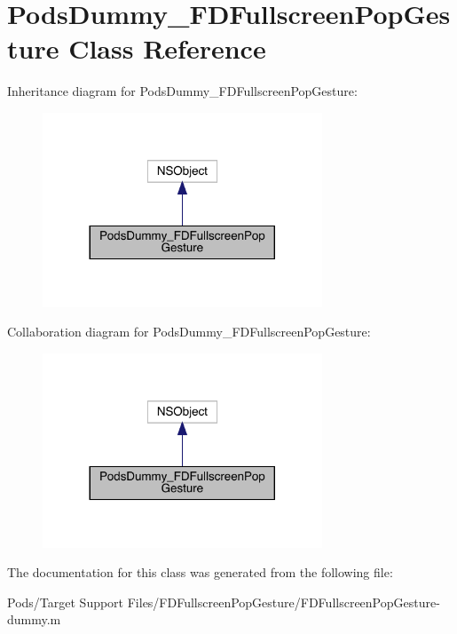 \hypertarget{interface_pods_dummy___f_d_fullscreen_pop_gesture}{}\section{Pods\+Dummy\+\_\+\+F\+D\+Fullscreen\+Pop\+Gesture Class Reference}
\label{interface_pods_dummy___f_d_fullscreen_pop_gesture}


Inheritance diagram for Pods\+Dummy\+\_\+\+F\+D\+Fullscreen\+Pop\+Gesture\+:\nopagebreak
\begin{figure}[H]
\begin{center}
\leavevmode
\includegraphics[width=236pt]{interface_pods_dummy___f_d_fullscreen_pop_gesture__inherit__graph}
\end{center}
\end{figure}


Collaboration diagram for Pods\+Dummy\+\_\+\+F\+D\+Fullscreen\+Pop\+Gesture\+:\nopagebreak
\begin{figure}[H]
\begin{center}
\leavevmode
\includegraphics[width=236pt]{interface_pods_dummy___f_d_fullscreen_pop_gesture__coll__graph}
\end{center}
\end{figure}


The documentation for this class was generated from the following file\+:\begin{DoxyCompactItemize}
\item 
Pods/\+Target Support Files/\+F\+D\+Fullscreen\+Pop\+Gesture/F\+D\+Fullscreen\+Pop\+Gesture-\/dummy.\+m\end{DoxyCompactItemize}
